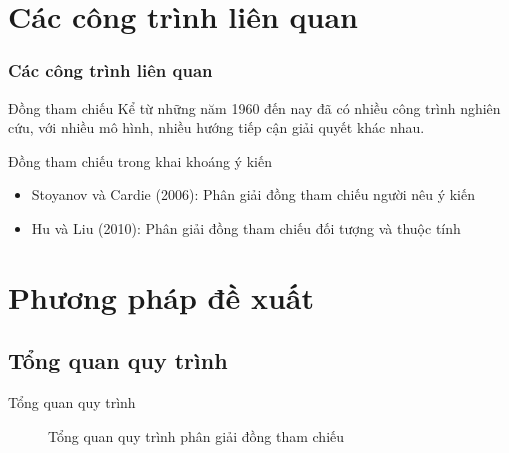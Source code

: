 \documentclass[9pt,xcolor=table,hyperref=unicode]{beamer}
\begin{document}
	\section{Các công trình liên quan}
	\begin{frame}
		\frametitle{Các công trình liên quan}
		\begin{block}{Đồng tham chiếu}
			Kể từ những năm 1960 đến nay đã có nhiều công trình nghiên cứu, với nhiều mô hình, nhiều hướng tiếp cận giải quyết khác nhau.
		\end{block}
		\begin{block}{Đồng tham chiếu trong khai khoáng ý kiến}
			\begin{itemize}
				\item{Stoyanov và Cardie (2006): Phân giải đồng tham chiếu người nêu ý kiến}
				\item{Hu và Liu (2010): Phân giải đồng tham chiếu đối tượng và thuộc tính}
			\end{itemize}
		\end{block}		
	\end{frame}

	\section{Phương pháp đề xuất}
	\subsection{Tổng quan quy trình}
	\begin{frame}{Tổng quan quy trình}		
		\begin{figure}[H]
			\LARGE 
			\centering				
			\resizebox{100mm}{!}{}
			\caption{Tổng quan quy trình phân giải đồng tham chiếu}	
			\label{fig:generalmodel}						
		\end{figure}
	\end{frame}	
\end{document}
